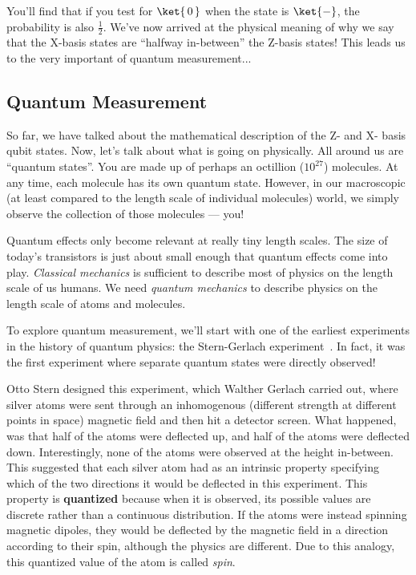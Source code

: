 \documentclass{article}
\newcommand{\kz}[1]{\ket{\,#1\,}}
\newcommand{\kx}[1]{\ket{#1}}
\begin{document}
You'll find that if you test for $\kz0$ when the state is $\kx-$, the probability is also $\frac{1}{2}$.  We've now arrived at the physical meaning of why we say that the X-basis states are ``halfway in-between'' the Z-basis states!  This leads us to the very important of quantum measurement...

\subsection{Quantum Measurement}
So far, we have talked about the mathematical description of the Z- and X- basis qubit states.  Now, let's talk about what is going on physically.
All around us are ``quantum states''.  You are made up of perhaps an octillion ($10^{27}$) molecules.  At any time, each molecule has its own quantum state.  However, in our macroscopic (at least compared to the length scale of individual molecules) world, we simply observe the collection of those molecules --- you!

Quantum effects only become relevant at really tiny length scales.  The size of today's transistors is just about small enough that quantum effects come into play.
\textit{Classical mechanics} is sufficient to describe most of physics on the length scale of us humans.  We need \textit{quantum mechanics} to describe physics on the length scale of atoms and molecules.

To explore quantum measurement, we'll start with one of the earliest experiments in the history of quantum physics: the Stern-Gerlach experiment~\cite{Gerlach_Stern_1922}.  In fact, it was the first experiment where separate quantum states were directly observed!

Otto Stern designed this experiment, which Walther Gerlach carried out, where silver atoms were sent through an inhomogenous (different strength at different points in space) magnetic field and then hit a detector screen.  What happened, was that half of the atoms were deflected up, and half of the atoms were deflected down.  Interestingly, none of the atoms were observed at the height in-between.  This suggested that each silver atom had as an intrinsic property specifying which of the two directions it would be deflected in this experiment.  This property is \textbf{quantized} because when it is observed, its possible values are discrete rather than a continuous distribution.  If the atoms were instead spinning magnetic dipoles, they would be deflected by the magnetic field in a direction according to their spin, although the physics are different.  Due to this analogy, this quantized value of the atom is called \textit{spin}.
\end{document}
